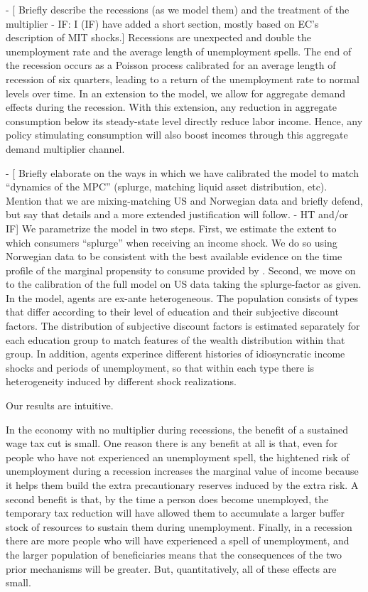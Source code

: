 \documentclass[../HAFiscal]{subfiles}
\begin{document}
- [ Briefly describe the recessions (as we model them) and the treatment of the multiplier - IF: I (IF) have added a short section, mostly based on EC's description of MIT shocks.]
Recessions are unexpected and double the unemployment rate and the average length of unemployment spells. The end of the recession occurs as a Poisson process calibrated for an average length of recession of six quarters, leading to a return of the unemployment rate to normal levels over time. In an extension to the model, we allow for aggregate demand effects during the recession. With this extension, any reduction in aggregate consumption below its steady-state level directly reduce labor income. Hence, any policy stimulating consumption will also boost incomes through this aggregate demand multiplier channel.

- [ Briefly elaborate on the ways in which we have calibrated the model to match ``dynamics of the MPC'' (splurge, matching liquid asset distribution, etc).  Mention that we are mixing-matching US and Norwegian data and briefly defend, but say that details and a more extended justification will follow. - HT and/or IF]
We parametrize the model in two steps. First, we estimate the extent to which consumers ``splurge'' when receiving an income shock. We do so using Norwegian data to be consistent with the best available evidence on the time profile of the marginal propensity to consume provided by \citet{fagereng_mpc_2021}. Second, we move on to the calibration of the full model on US data taking the splurge-factor as given. In the model, agents are ex-ante heterogeneous. The population consists of types that differ according to their level of education and their subjective discount factors. The distribution of subjective discount factors is estimated separately for each education group to match features of the wealth distribution within that group. In addition, agents experince different histories of idiosyncratic income shocks and periods of unemployment, so that within each type there is heterogeneity induced by different shock realizations. 


Our results are intuitive.

In the economy with no multiplier during recessions, the benefit of a sustained wage tax cut is small.  One reason there is any benefit at all is that, even for people who have not experienced an unemployment spell, the hightened risk of unemployment during a recession increases the marginal value of income because it helps them build the extra precautionary reserves induced by the extra risk.  A second benefit is that, by the time a person does become unemployed, the temporary tax reduction will have allowed them to accumulate a larger buffer stock of resources to sustain them during unemployment.  Finally, in a recession there are more people who will have experienced a spell of unemployment, and the larger population of beneficiaries means that the consequences of the two prior mechanisms will be greater.  But, quantitatively, all of these effects are small.
\end{document}
